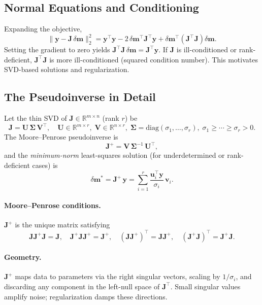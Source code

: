 \documentclass[11pt,a4paper]{article}
\begin{document}
\subsection{Normal Equations and Conditioning}
Expanding the objective,
\[
\|\mathbf{y}-\mathbf{J}\,\delta\mathbf{m}\|_2^2
= \mathbf{y}^\top\mathbf{y} - 2\,\delta\mathbf{m}^\top \mathbf{J}^\top \mathbf{y}
+ \delta\mathbf{m}^\top (\mathbf{J}^\top \mathbf{J}) \delta\mathbf{m}.
\]
Setting the gradient to zero yields $\mathbf{J}^\top \mathbf{J}\,\delta\mathbf{m}=\mathbf{J}^\top \mathbf{y}$.
If $\mathbf{J}$ is ill-conditioned or rank-deficient, $\mathbf{J}^\top \mathbf{J}$ is more ill-conditioned (squared condition number). This motivates SVD-based solutions and regularization.

\subsection{The Pseudoinverse in Detail}\label{subsec:pseudo}
Let the thin SVD of $\mathbf{J}\in\mathbb{R}^{m\times n}$ (rank $r$) be
\[
\mathbf{J} = \mathbf{U}\,\bm{\Sigma}\,\mathbf{V}^\top, \quad
\mathbf{U}\in\mathbb{R}^{m\times r},\; \mathbf{V}\in\mathbb{R}^{n\times r},\;
\bm{\Sigma}=\mathrm{diag}(\sigma_1,\ldots,\sigma_r),\; \sigma_1\ge\cdots\ge\sigma_r>0.
\]
The Moore--Penrose pseudoinverse is
\[
\mathbf{J}^+ = \mathbf{V}\,\bm{\Sigma}^{-1}\,\mathbf{U}^\top,
\]
and the \emph{minimum-norm} least-squares solution (for underdetermined or rank-deficient cases) is
\[
\delta\mathbf{m}^* = \mathbf{J}^+\,\mathbf{y}
= \sum_{i=1}^r \frac{\mathbf{u}_i^\top \mathbf{y}}{\sigma_i}\,\mathbf{v}_i.
\]
\paragraph{Moore--Penrose conditions.} $\mathbf{J}^+$ is the unique matrix satisfying
\[
\mathbf{J}\mathbf{J}^+\mathbf{J}=\mathbf{J},\quad
\mathbf{J}^+\mathbf{J}\mathbf{J}^+=\mathbf{J}^+,\quad
(\mathbf{J}\mathbf{J}^+)^\top=\mathbf{J}\mathbf{J}^+,\quad
(\mathbf{J}^+\mathbf{J})^\top=\mathbf{J}^+\mathbf{J}.
\]
\paragraph{Geometry.} $\mathbf{J}^+$ maps data to parameters via the right singular vectors, scaling by $1/\sigma_i$, and discarding any component in the left-null space of $\mathbf{J}^\top$. Small singular values amplify noise; regularization damps these directions.
\end{document}
